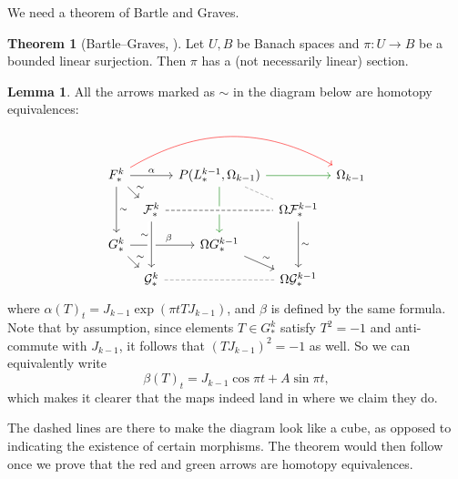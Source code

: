\documentclass{shortart}
\theoremstyle{definition}
\newtheorem*{thm}{Theorem}
\newtheorem*{lemma}{Lemma}
\begin{document}
We need a theorem of Bartle and Graves.
\begin{thm}[Bartle--Graves, {\cite{bartlegraves52}}] %
  Let $U, B$ be Banach spaces and $\pi: U \to B$ be a bounded linear surjection. Then $\pi$ has a (not necessarily linear) section.
\end{thm}

\begin{lemma}
  All the arrows marked as $\sim$ in the diagram below are homotopy equivalences:
  \[
    \begin{tikzcd}[row sep=small, column sep=tiny]
      F^k_* \ar[rrrr, bend left, red] \ar[rr, "\alpha"] \ar[dd, "\sim"] \ar[rd, "\sim"] && P(L^{k - 1}_*, \Omega_{k - 1}) \ar[rd, dash, dashed, gray] \ar[dd, green!50!black] \ar[rr, green!50!black] & & \Omega_{k - 1}\\
      & \mathcal{F}^k_* \ar[rr, crossing over, dash, dashed] && \Omega \mathcal{F}^{k - 1}_* \ar[dd, "\sim"]\\
      G^k_* \ar[rr, "\beta", pos=0.6] \ar[rd, "\sim"] & & \Omega G^{k - 1}_* \ar[rd, "\sim"]\\
      & \mathcal{G}^k_* \ar[from=uu, crossing over, "\sim"', pos=0.3] \ar[rr, dash, gray, dashed] & & \Omega \mathcal{G}^{k - 1}_*
    \end{tikzcd}
  \]
  where $\alpha(T)_t = J_{k - 1} \exp (\pi t TJ_{k - 1})$, and $\beta$ is defined by the same formula. Note that by assumption, since elements $T \in G_*^k$ satisfy $T^2 = -1$ and anti-commute with $J_{k - 1}$, it follows that $(TJ_{k - 1})^2 = -1$ as well. So we can equivalently write
  \[
    \beta(T)_t = J_{k - 1}\cos \pi t + A \sin \pi t,
  \]
  which makes it clearer that the maps indeed land in where we claim they do.
\end{lemma}
The dashed lines are there to make the diagram look like a cube, as opposed to indicating the existence of certain morphisms. The theorem would then follow once we prove that the red and green arrows are homotopy equivalences.
\end{document}
